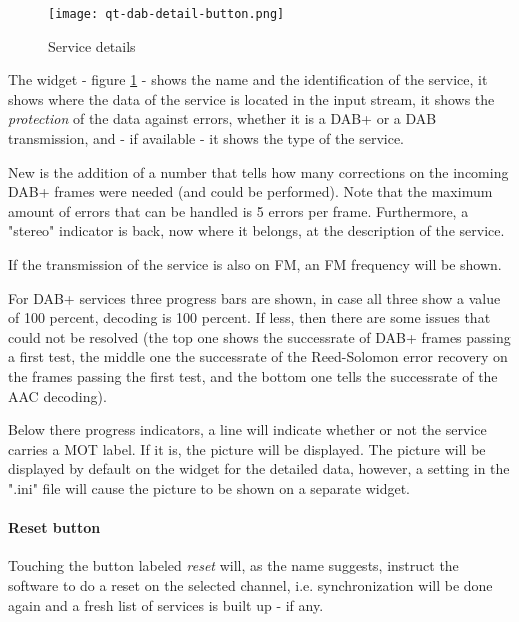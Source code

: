 \documentclass[12pt]{article}
\begin{document}
\begin{figure}[htp]
\centering
\texttt{[image: qt-dab-detail-button.png]}
\caption{Service details}
\label{figure:service-details}
\end{figure}
\par
The widget - figure \ref{figure:service-details} -
shows the name and the identification of the service,
it shows where the data of the service is located in the input stream,
it shows the {\em protection} of the data against errors, whether it is
a DAB+ or a DAB transmission, and - if available -  it shows the
type of the service.
\par
New is the addition of a number that tells how many corrections on the
incoming DAB+ frames were needed (and could be performed). Note that
the maximum amount of errors that can be handled is 5 errors per frame.
Furthermore, a "stereo" indicator is back, now where it belongs, at the
description of the service.
\par
If the transmission of the service is also on FM, an FM frequency will be shown.
\par
For DAB+ services three progress 
bars are shown, in case all three
show a value of 100 percent, decoding is 100 percent. If less, then there
are some issues that could not be resolved
(the top one shows the successrate of DAB+ frames passing a first test,
the middle one the successrate of the Reed-Solomon error recovery on the
frames passing the first test,
and the bottom one tells the successrate of the AAC decoding).
\par
Below there progress indicators, a line will indicate whether or not
the service carries a MOT label. If it is, the picture
will be displayed.
The picture will be displayed by default on the widget for the detailed data,
however, a setting in the ".ini" file will cause the picture to be shown
on a separate widget.
\paragraph{Reset button}
Touching the button labeled {\em reset} will, as the name suggests, instruct the
software to do a reset on the selected channel,
i.e. synchronization will be done again and
a fresh list of services is built up - if any.
\end{document}
